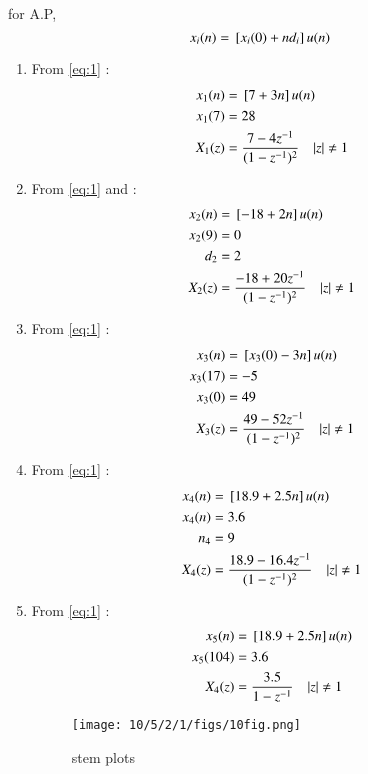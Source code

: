 \documentclass[journal,12pt,twocolumn]{IEEEtran}
\theoremstyle{remark}
\begin{document}
\begin{table}[h!]
  \centering
  
   \label{tab:Table1}
\end{table}
\solution
for A.P,
\begin{equation}
    x_i(n) = {}\left[x_i(0) + nd_i\right] u(n)
    \label{eq:1}
\end{equation}
\begin{enumerate}
\item From \eqref{eq:1}  :
\begin{align}
x_1(n) &= {}\left[7+3n\right]u(n)\\
x_1(7) &= 28\\
X_1(z) &= \frac{7 - 4z^{-1}}{(1 - z^{-1})^2} \quad |z| \neq 1
\end{align}
\item From \eqref{eq:1} and  :
\begin{align}
x_2(n) &= {}\left[-18 + 2n\right]u(n)\\
x_2(9) &= 0\\
d_2 &= 2\\
X_2(z) &= \frac{-18 + 20z^{-1}}{(1 - z^{-1})^2}
 \quad |z| \neq 1
\end{align}
\item From \eqref{eq:1}  :
\begin{align}
x_3(n) &= {}\left[x_3(0)-3n\right]u(n)\\
x_3(17) &= -5\\
x_3(0) &= 49\\
X_3(z) &= \frac{49 - 52z^{-1}}{(1 - z^{-1})^2}
 \quad |z| \neq 1
\end{align}
\item From \eqref{eq:1}  :
\begin{align}
x_4(n) &= {}\left[18.9+2.5n\right]u(n)\\
x_4(n) &= 3.6\\
n_4    &= 9\\
X_4(z) &= \frac{18.9 - 16.4z^{-1}}{(1 - z^{-1})^2}
 \quad |z| \neq 1
\end{align}
\item From \eqref{eq:1}  :
\begin{align}
x_5(n) &= {}\left[18.9+2.5n\right]u(n)\\
x_5(104) &= 3.6\\
X_4(z) &= \frac{3.5}{1-z^{-1}} \quad |z| \neq 1
\end{align}
\begin{figure}[h!]
    \centering
    \texttt{[image: 10/5/2/1/figs/10fig.png]}
    \caption{stem plots }
    \label{fig:1}
\end{figure}
\end{enumerate}
\end{document}
